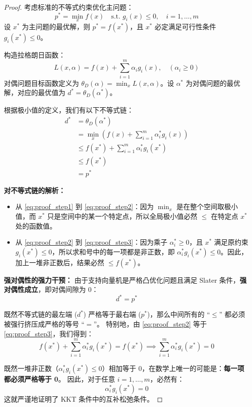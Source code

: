 \documentclass[UTF8]{ctexart}
\numberwithin{equation}{section}
\begin{document}
\begin{proof}
考虑标准的不等式约束优化主问题：
\[ p^* = \min_x f(x) \quad \text{s.t. } g_i(x) \le 0, \quad i = 1, \dots, m \]
设 $x^*$ 为主问题的最优解，则 $p^* = f(x^*)$，且 $x^*$ 必定满足可行性条件 $g_i(x^*) \le 0$。

构造拉格朗日函数：
\[ L(x, \alpha) = f(x) + \sum_{i=1}^m \alpha_i g_i(x), \quad (\alpha_i \ge 0) \]
对偶问题目标函数定义为 $\theta_D(\alpha) = \min_x L(x, \alpha)$。设 $\alpha^*$ 为对偶问题的最优解，对应的最优值为 $d^* = \theta_D(\alpha^*)$。

根据极小值的定义，我们有以下不等式链：
\begin{align}
    d^* &= \theta_D(\alpha^*) \nonumber \\
    &= \min_x \left( f(x) + \sum_{i=1}^m \alpha_i^* g_i(x) \right) \label{eq:proof_step1} \\
    &\le f(x^*) + \sum_{i=1}^m \alpha_i^* g_i(x^*) \label{eq:proof_step2} \\
    &\le f(x^*) \label{eq:proof_step3} \\
    &= p^* \nonumber
\end{align}

\textbf{对不等式链的解析：}
\begin{itemize}
    \item 从 \eqref{eq:proof_step1} 到 \eqref{eq:proof_step2}：因为 $\min_x$ 是在整个空间取极小值，而 $x^*$ 只是空间中的某一个特定点，所以全局极小值必然 $\le$ 在特定点 $x^*$ 处的函数值。
    \item 从 \eqref{eq:proof_step2} 到 \eqref{eq:proof_step3}：因为乘子 $\alpha_i^* \ge 0$，且 $x^*$ 满足原约束 $g_i(x^*) \le 0$，所以求和号中的每一项都是非正数，即 $\alpha_i^* g_i(x^*) \le 0$。因此，加上一堆非正数后，结果必然 $\le f(x^*)$。
\end{itemize}

\textbf{强对偶性的强力干预：}
由于支持向量机是严格凸优化问题且满足 Slater 条件，\textbf{强对偶性成立}，即对偶间隙为 0：
\[ d^* = p^* \]

既然不等式链的最左端 ($d^*$) 严格等于最右端 ($p^*$)，那么中间所有的 “$\le$” 都必须被强行挤压成严格的等号 “$=$”。
特别地，由 \eqref{eq:proof_step2} 等于 \eqref{eq:proof_step3}，我们得到：
\[ f(x^*) + \sum_{i=1}^m \alpha_i^* g_i(x^*) = f(x^*) \implies \sum_{i=1}^m \alpha_i^* g_i(x^*) = 0 \]

既然一堆非正数（$\alpha_i^* g_i(x^*) \le 0$）相加等于 0，在数学上唯一的可能是：\textbf{每一项都必须严格等于 0}。
因此，对于任意 $i = 1, \dots, m$，必然有：
\[ \alpha_i^* g_i(x^*) = 0 \]
这就严谨地证明了 KKT 条件中的互补松弛条件。
\end{proof}
\end{document}
